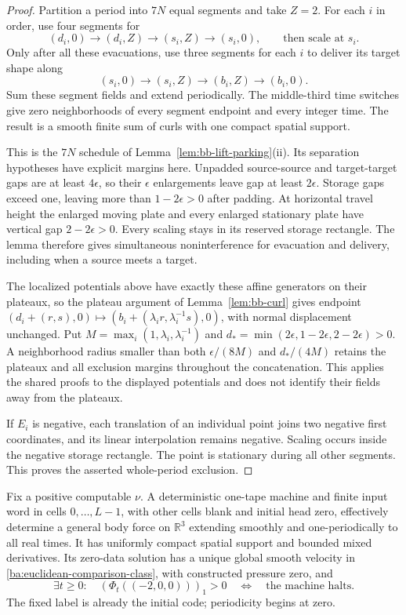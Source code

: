 \begin{proof}
Partition a period into $7N$ equal segments and take $Z=2$.  For each
$i$ in order, use four segments for
\[
 (d_i,0)\longrightarrow(d_i,Z)\longrightarrow(s_i,Z)
                \longrightarrow(s_i,0),\qquad\text{then scale at }s_i.
\]
Only after all these evacuations, use three segments for each $i$ to
deliver its target shape along
\[
 (s_i,0)\longrightarrow(s_i,Z)\longrightarrow(b_i,Z)
                                      \longrightarrow(b_i,0).
\]
Sum these segment fields and extend periodically.  The middle-third
time switches give zero neighborhoods of every segment endpoint and
every integer time.  The result is a smooth finite sum of curls with
one compact spatial support.

This is the $7N$ schedule of Lemma~\ref{lem:bb-lift-parking}(ii).
Its separation hypotheses have explicit margins here.  Unpadded
source-source and target-target gaps are at least $4\epsilon$, so their
$\epsilon$ enlargements leave gap at least $2\epsilon$.  Storage
gaps exceed one, leaving more than $1-2\epsilon>0$ after padding.
At horizontal travel height the enlarged moving plate and every
enlarged stationary plate have vertical gap $2-2\epsilon>0$.
Every scaling stays in its reserved storage rectangle.  The lemma
therefore gives simultaneous noninterference for evacuation and delivery,
including when a source meets a target.

The localized potentials above have exactly these affine generators on
their plateaux, so the plateau argument of Lemma~\ref{lem:bb-curl}
gives endpoint
$(d_i+(r,s),0)\mapsto(b_i+(\lambda_i r,\lambda_i^{-1}s),0)$,
with normal displacement unchanged.  Put
$M=\max_i(1,\lambda_i,\lambda_i^{-1})$ and
$d_*=\min(2\epsilon,1-2\epsilon,2-2\epsilon)>0$.
A neighborhood radius smaller than both $\epsilon/(8M)$ and
$d_*/(4M)$ retains the plateaux and all exclusion margins throughout
the concatenation.  This applies the shared proofs to the displayed
potentials and does not identify their fields away from the plateaux.

If $E_i$ is negative, each translation of an individual point joins two
negative first coordinates, and its linear interpolation remains negative.
Scaling occurs inside the negative storage rectangle.  The point is
stationary during all other segments.  This proves the asserted
whole-period exclusion.
\end{proof}

\begin{theorem}
\label{ba:periodic-parking}
Fix a positive computable $\nu$.  A deterministic one-tape machine and
finite input word in cells $0,\ldots,L-1$, with other cells blank and
initial head zero, effectively determine a general body force on
$\mathbb R^3$ extending smoothly and one-periodically to all real times.
It has uniformly compact spatial support and bounded mixed derivatives.
Its zero-data solution has a unique global smooth velocity in
\eqref{ba:euclidean-comparison-class}, with constructed pressure zero, and
\[
 \exists t\ge0:\quad (\Phi_t((-2,0,0)))_1>0
 \quad\Longleftrightarrow\quad\text{the machine halts}.
\]
The fixed label is already the initial code; periodicity begins at zero.
\end{theorem}

